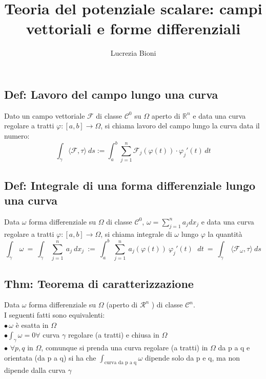 \documentclass{article} %
\title{Teoria del potenziale scalare: campi vettoriali e forme differenziali} %
\author{Lucrezia Bioni} %
\date{} %
\begin{document}
    \maketitle

    \subsection*{Def: Lavoro del campo lungo una curva}
    Dato un campo vettoriale $\mathcal{F} $ di classe $ \mathcal{C} ^0 $ su $\Omega$ aperto di $ \mathbb{R} ^n $
    e data una curva regolare a tratti $\varphi:[a,b]\to \Omega $, si chiama lavoro del campo lungo la curva data il numero:
    $$ \int _\gamma \langle \mathcal{F} , \tau \rangle \  ds := \int_{a}^{b} \sum_{j = 1}^{n}  \mathcal{F}_j(\varphi (t)) \cdot \varphi_j ' (t) \,dt  $$

    \subsection*{Def: Integrale di una forma differenziale lungo una curva}
    Data $\omega $ forma differenziale su $\Omega $ di classe $ \mathcal{C} ^0 $, $ \omega = \sum_{j = 1}^{n} a_j dx_j $
    e data una curva regolare a tratti $\varphi:[a,b]\to \Omega $, si chiama integrale di $\omega$ lungo $\varphi$ la quantità
    $$ \int _\gamma  \ \omega \ = \ \int _\gamma \ \sum_{j = 1}^{n} \ a_j \ dx_j\ :=\  \int_{a}^{b} \ \sum_{j = 1}^{n} \ a_j ( \varphi (t) ) \ \varphi_j ' (t) \,\ \ dt \ = \ \int _\gamma \ \langle \mathcal{F} _\omega , \tau \rangle \  ds  $$

    \subsection*{Thm: Teorema di caratterizzazione}
    Data $\omega$ forma differenziale su $\Omega$ (aperto di $\mathcal{R}^n$ ) di classe $\mathcal{C} ^n$. \\
    I seguenti fatti sono equivalenti: \\
    $\bullet \, \omega$ è esatta in $\Omega$ \\
    $\bullet \int_{\gamma} \omega = 0 \forall$ curva $\gamma$ regolare (a tratti) e chiusa in $\Omega$ \\
    $\bullet$ $\forall p,q$ in $\Omega$, comunque si prenda una curva regolare (a tratti) in $\Omega$ da p a q e orientata (da p a q) si ha che $ \int_{\text{curva da p a q}} \omega$ dipende solo da p e q, ma non dipende dalla curva $\gamma$
\end{document}
